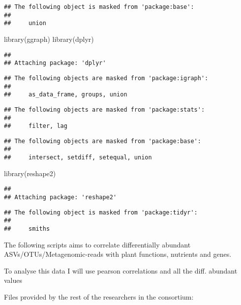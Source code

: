 \documentclass[
]{article}
\newenvironment{Shaded}{\begin{snugshade}}{\end{snugshade}}
\newcommand{\FunctionTok}[1]{\textcolor[rgb]{0.00,0.00,0.00}{#1}}
\newcommand{\NormalTok}[1]{#1}
\begin{document}
\begin{verbatim}
## The following object is masked from 'package:base':
## 
##     union
\end{verbatim}

\begin{Shaded}
\begin{Highlighting}[]
\FunctionTok{library}\NormalTok{(ggraph)}
\FunctionTok{library}\NormalTok{(dplyr)}
\end{Highlighting}
\end{Shaded}

\begin{verbatim}
## 
## Attaching package: 'dplyr'
\end{verbatim}

\begin{verbatim}
## The following objects are masked from 'package:igraph':
## 
##     as_data_frame, groups, union
\end{verbatim}

\begin{verbatim}
## The following objects are masked from 'package:stats':
## 
##     filter, lag
\end{verbatim}

\begin{verbatim}
## The following objects are masked from 'package:base':
## 
##     intersect, setdiff, setequal, union
\end{verbatim}

\begin{Shaded}
\begin{Highlighting}[]
\FunctionTok{library}\NormalTok{(reshape2)}
\end{Highlighting}
\end{Shaded}

\begin{verbatim}
## 
## Attaching package: 'reshape2'
\end{verbatim}

\begin{verbatim}
## The following object is masked from 'package:tidyr':
## 
##     smiths
\end{verbatim}

The following scripts aims to correlate differentially abundant
ASVs/OTUs/Metagenomic-reads with plant functions, nutrients and genes.

To analyse this data I will use pearson correlations and all the diff.
abundant values

Files provided by the rest of the researchers in the consortium:
\end{document}
